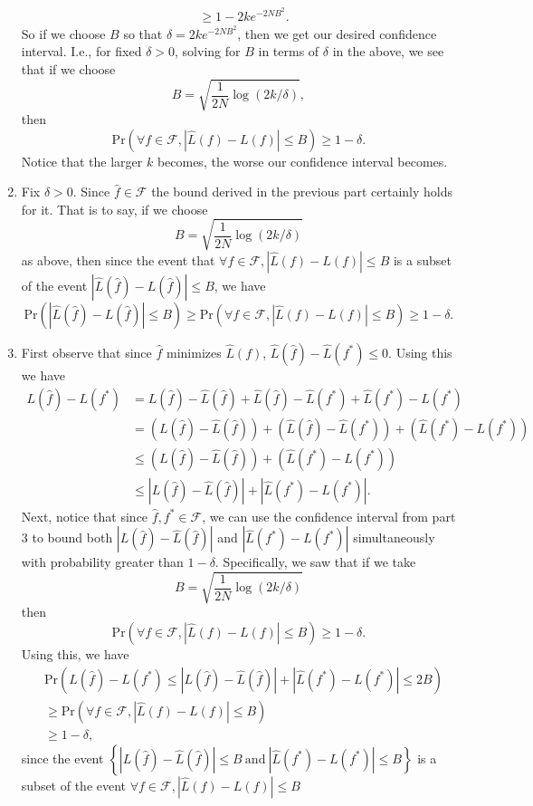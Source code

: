 \documentclass{article}
\begin{document}
\begin{enumerate}
\begin{align*}
		&\geq 1 - 2ke^{-2NB^2}.
	\end{align*}
	So if we choose $B$ so that $\delta = 2ke^{-2NB^2}$, then we get our desired confidence interval. I.e., for fixed $\delta>0$, solving for $B$ in terms of $\delta$ in the above, we see that if we choose
	\[
		B = \sqrt{\frac{1}{2N}\log(2k/\delta)},
	\]
	then 
	\[
		\mathrm{Pr}\left(\forall f\in\mathcal{F},|\hat L(f)-L(f)|\leq B\right) \geq 1-\delta.
	\]
	Notice that the larger $k$ becomes, the worse our confidence interval becomes.
	\item Fix $\delta>0$. Since $\hat f\in\mathcal{F}$ the bound derived in the previous part certainly holds for it. That is to say, if we choose
	\[
		B = \sqrt{\frac{1}{2N}\log(2k/\delta)}
	\]
	as above, then since the event that $\forall f\in\mathcal{F},|\hat L(f)-L(f)|\leq B$ is a subset of the event $|\hat L(\hat f)- L(\hat f)|\leq B$, we have
	\[
		\mathrm{Pr}\left( |\hat L(\hat f)-L(\hat f)|\leq B \right) \geq \mathrm{Pr}\left(\forall f\in\mathcal{F},|\hat L(f)-L(f)|\leq B\right) \geq 1-\delta.
	\]
	\item First observe that since $\hat f$ minimizes $\hat L(f)$, $\hat L(\hat f)-\hat L(f^*)\leq 0$. Using this we have
	\begin{align*}
		L(\hat f)-L(f^*) &= L(\hat f)-\hat L(\hat f)+\hat L(\hat f)-\hat L(f^*)+\hat L(f^*)-L(f^*)\\
		&= \left(L(\hat f)-\hat L(\hat f)\right) + \left(\hat L(\hat f)-\hat L(f^*)\right) + \left(\hat L(f^*)-L(f^*)\right)\\
		&\leq \left(L(\hat f)-\hat L(\hat f)\right) + \left(\hat L(f^*)-L(f^*)\right)\\
		&\leq \left|L(\hat f)-\hat L(\hat f)\right| + \left|\hat L(f^*)-L(f^*)\right|.
	\end{align*}
	Next, notice that since $\hat f,f^*\in\mathcal{F}$, we can use the confidence interval from part 3 to bound both $\left|L(\hat f)-\hat L(\hat f)\right|$ and $\left|\hat L(f^*)-L(f^*)\right|$ simultaneously with probability greater than $1-\delta$. Specifically, we saw that if we take
	\[
		B = \sqrt{\frac{1}{2N}\log(2k/\delta)}
	\]
	then 
	\[
		\mathrm{Pr}\left(\forall f\in\mathcal{F},|\hat L(f)-L(f)|\leq B\right) \geq 1-\delta.
	\]
	Using this, we have
	\begin{align*}
		&\mathrm{Pr}\left(L(\hat f)-L(f^*) \leq \left|L(\hat f)-\hat L(\hat f)\right| + \left|\hat L(f^*)-L(f^*)\right|\leq 2B\right)\\
		&\geq \mathrm{Pr}\left(\forall f\in\mathcal{F},|\hat L(f)-L(f)|\leq B\right)\\
		&\geq 1-\delta,
	\end{align*}
	since the event $\left\{\left|L(\hat f)-\hat L(\hat f)\right|\leq B~\mathrm{and}~\left|\hat L(f^*)-L(f^*)\right|\leq B\right\}$ is a subset of the event $\forall f\in\mathcal{F},|\hat L(f)-L(f)|\leq B$


\end{enumerate}
\end{document}
